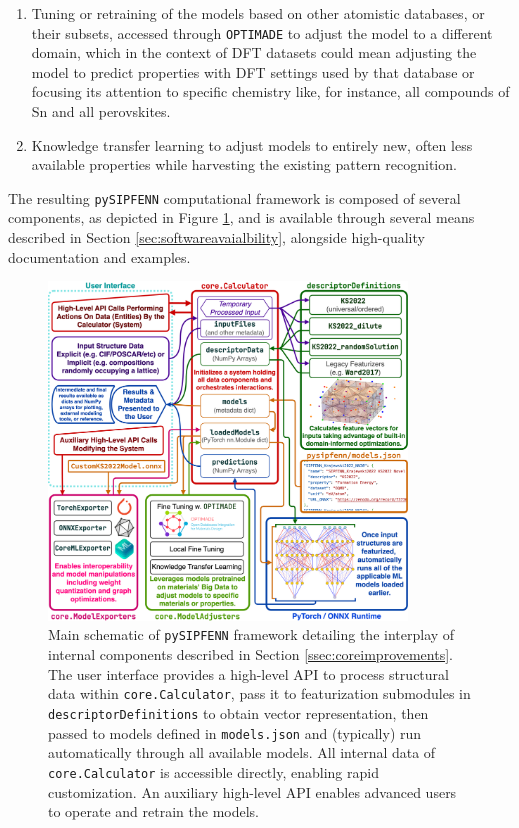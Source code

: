 \begin{enumerate}
\begin{enumerate}
        \item Tuning or retraining of the models based on other atomistic databases, or their subsets, accessed through \texttt{OPTIMADE} \cite{Andersen2021OPTIMADEData, Evans2024DevelopmentsExchange} to adjust the model to a different domain, which in the context of DFT datasets could mean adjusting the model to predict properties with DFT settings used by that database or focusing its attention to specific chemistry like, for instance, all compounds of Sn and all perovskites.
        
        \item Knowledge transfer learning \cite{Torrey2010HandbookLearning} to adjust models to entirely new, often less available properties while harvesting the existing pattern recognition.
    \end{enumerate}    
\end{enumerate}

The resulting \texttt{pySIPFENN} computational framework is composed of several components, as depicted in Figure \ref{fig:pySIPFENNMainSchematic}, and is available through several means described in Section \ref{sec:softwareavaialbility}, alongside high-quality documentation and examples.

\begin{figure}[h!]
    \centering
    \includegraphics[width=0.85\textwidth]{pySIPFENN_MainSchematic.png}
    \caption{Main schematic of \texttt{pySIPFENN} framework detailing the interplay of internal components described in Section \ref{ssec:coreimprovements}. The user interface provides a high-level API to process structural data within \texttt{core.Calculator}, pass it to featurization submodules in \texttt{descriptorDefinitions} to obtain vector representation, then passed to models defined in \texttt{models.json} and (typically) run automatically through all available models. All internal data of \texttt{core.Calculator} is accessible directly, enabling rapid customization. An auxiliary high-level API enables advanced users to operate and retrain the models.}
    \label{fig:pySIPFENNMainSchematic}
\end{figure}


